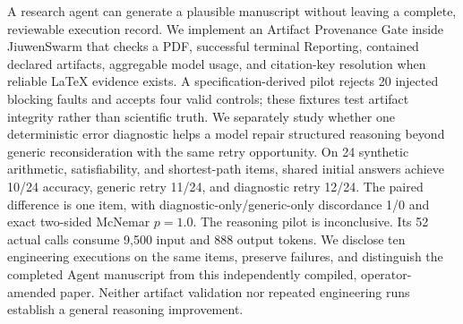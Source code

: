 A research agent can generate a plausible manuscript without leaving a complete, reviewable execution record. We implement an Artifact Provenance Gate inside JiuwenSwarm that checks a PDF, successful terminal Reporting, contained declared artifacts, aggregable model usage, and citation-key resolution when reliable LaTeX evidence exists. A specification-derived pilot rejects 20 injected blocking faults and accepts four valid controls; these fixtures test artifact integrity rather than scientific truth. We separately study whether one deterministic error diagnostic helps a model repair structured reasoning beyond generic reconsideration with the same retry opportunity. On 24 synthetic arithmetic, satisfiability, and shortest-path items, shared initial answers achieve 10/24 accuracy, generic retry 11/24, and diagnostic retry 12/24. The paired difference is one item, with diagnostic-only/generic-only discordance 1/0 and exact two-sided McNemar $p=1.0$. The reasoning pilot is inconclusive. Its 52 actual calls consume 9,500 input and 888 output tokens. We disclose ten engineering executions on the same items, preserve failures, and distinguish the completed Agent manuscript from this independently compiled, operator-amended paper. Neither artifact validation nor repeated engineering runs establish a general reasoning improvement.
